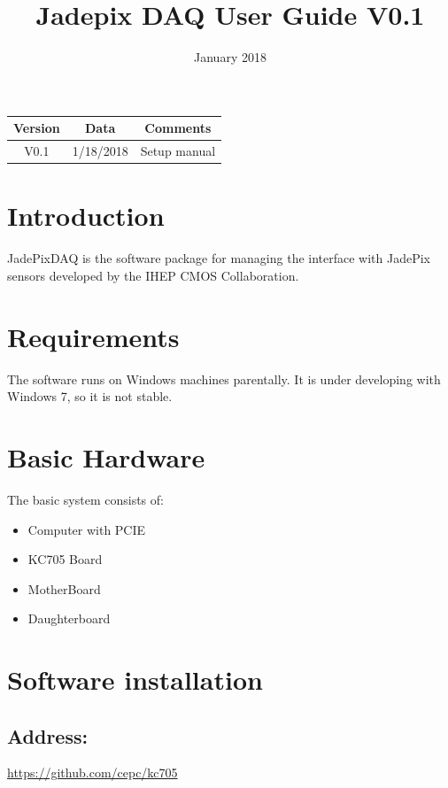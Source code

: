 \documentclass{article}
\title{\textbf{Jadepix DAQ User Guide V0.1}}
\date{January 2018}
\begin{document}
\maketitle

\begin{table}[]
    \centering
    \begin{tabular}{c|c|c}
    \hline
        Version & Data & Comments \\
    \hline
        V0.1 & 1/18/2018 & Setup manual\\
    \hline
    \end{tabular}
\end{table}


\setcounter{page}{0}
\thispagestyle{empty}

\newpage

\tableofcontents
\setcounter{page}{0}
\thispagestyle{empty}

\newpage

\section{Introduction}
JadePixDAQ is the software package for managing the interface with JadePix sensors developed by the IHEP CMOS Collaboration. 

\section{Requirements}
The software runs on Windows machines parentally. It is under developing with Windows 7, so it is not stable.


\section{Basic Hardware}
    The basic system consists of:

    \begin{itemize}
        \item Computer with PCIE 
        \item KC705 Board
        \item MotherBoard
        \item Daughterboard
    \end{itemize}

\section{Software installation}

    \subsection{Address:}
        \url{https://github.com/cepc/kc705}
        
\end{document}
